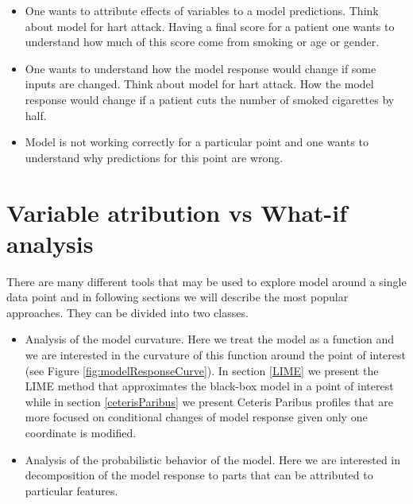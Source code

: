 \documentclass[]{book}
\providecommand{\tightlist}{%
  \setlength{\itemsep}{0pt}\setlength{\parskip}{0pt}}
\theoremstyle{definition}
\theoremstyle{definition}
\theoremstyle{definition}
\theoremstyle{remark}
\begin{document}
\begin{itemize}
\tightlist
\item
  One wants to attribute effects of variables to a model predictions.
  Think about model for hart attack. Having a final score for a patient
  one wants to understand how much of this score come from smoking or
  age or gender.
\item
  One wants to understand how the model response would change if some
  inputs are changed. Think about model for hart attack. How the model
  response would change if a patient cuts the number of smoked
  cigarettes by half.
\item
  Model is not working correctly for a particular point and one wants to
  understand why predictions for this point are wrong.
\end{itemize}

\hypertarget{variable-atribution-vs-what-if-analysis}{%
\section{Variable atribution vs What-if
analysis}\label{variable-atribution-vs-what-if-analysis}}

There are many different tools that may be used to explore model around
a single data point and in following sections we will describe the most
popular approaches. They can be divided into two classes.

\begin{itemize}
\tightlist
\item
  Analysis of the model curvature. Here we treat the model as a function
  and we are interested in the curvature of this function around the
  point of interest (see Figure \ref{fig:modelResponseCurve}). In
  section \ref{LIME} we present the LIME method that approximates the
  black-box model in a point of interest while in section
  \ref{ceterisParibus} we present Ceteris Paribus profiles that are more
  focused on conditional changes of model response given only one
  coordinate is modified.
\item
  Analysis of the probabilistic behavior of the model. Here we are
  interested in decomposition of the model response to parts that can be
  attributed to particular features.
\end{itemize}
\end{document}

